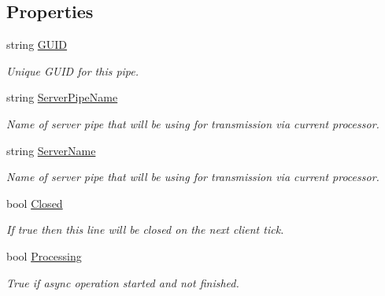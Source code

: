 \subsection*{Properties}
\begin{DoxyCompactItemize}
\item 
string \mbox{\hyperlink{class_pipes_provider_1_1_client_1_1_transmission_line_a6959acebfbb30be2aa0149779bc6822c}{G\+U\+ID}}
\begin{DoxyCompactList}\small\item\em Unique G\+U\+ID for this pipe. \end{DoxyCompactList}\item 
string \mbox{\hyperlink{class_pipes_provider_1_1_client_1_1_transmission_line_aa7e8a85952e05718b1a0ff96b9874766}{Server\+Pipe\+Name}}
\begin{DoxyCompactList}\small\item\em Name of server pipe that will be using for transmission via current processor. \end{DoxyCompactList}\item 
string \mbox{\hyperlink{class_pipes_provider_1_1_client_1_1_transmission_line_a3dc08ad974186de6b0439b052ea0d72a}{Server\+Name}}
\begin{DoxyCompactList}\small\item\em Name of server pipe that will be using for transmission via current processor. \end{DoxyCompactList}\item 
bool \mbox{\hyperlink{class_pipes_provider_1_1_client_1_1_transmission_line_a902851edce28b2ab7a7b9fc648a984d5}{Closed}}
\begin{DoxyCompactList}\small\item\em If true then this line will be closed on the next client tick. \end{DoxyCompactList}\item 
bool \mbox{\hyperlink{class_pipes_provider_1_1_client_1_1_transmission_line_af0385a70cb2f9dc29fb4e7040330aa4c}{Processing}}
\begin{DoxyCompactList}\small\item\em True if async operation started and not finished. \end{DoxyCompactList}\item 

\end{DoxyCompactItemize}
